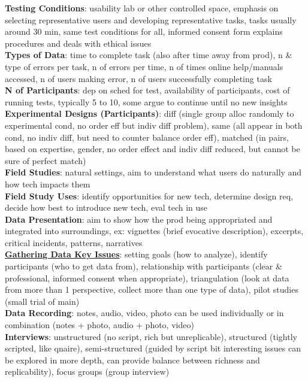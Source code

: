 \documentclass[a4paper]{article}
\begin{document}
\begin{multicols}{3}
        \textbf{Testing Conditions}: usability lab or other controlled space, emphasis on selecting representative users and developing representative tasks, tasks usually around 30 min, same test conditions for all, informed consent form explains procedures and deals with ethical issues\\
        \textbf{Types of Data}: time to complete task (also after time away from prod), n \& type of errors per task, n of errors per time, n of times online help/manuals accessed, n of users making error, n of users successfully completing task\\
        \textbf{N of Participants}: dep on sched for test, availability of participants, cost of running tests, typically 5 to 10, some argue to continue until no new insights\\
        \textbf{Experimental Designs (Participants)}: diff (single group alloc randomly to experimental cond, no order eff but indiv diff problem), same (all appear in both cond, no indiv diff, but need to counter balance order eff), matched (in pairs, based on expertise, gender, no order effect and indiv diff reduced, but cannot be sure of perfect match)\\
        \textbf{Field Studies}: natural settings, aim to understand what users do naturally and how tech impacts them\\
        \textbf{Field Study Uses}: identify opportunities for new tech, determine design req, decide how best to introduce new tech, eval tech in use\\
        \textbf{Data Presentation}: aim to show how the prod being appropriated and integrated into surroundings, ex: vignettes (brief evocative description), excerpts, critical incidents, patterns, narratives\\
        \underline{\textbf{Gathering Data Key Issues}}: setting goals (how to analyze), identify participants (who to get data from), relationship with participants (clear \& professional, informed consent when appropriate), triangulation (look at data from more than 1 perspective, collect more than one type of data), pilot studies (small trial of main)\\
        \textbf{Data Recording}: notes, audio, video, photo can be used individually or in combination (notes + photo, audio + photo, video)\\
        \textbf{Interviews}: unstructured (no script, rich but unreplicable), structured (tightly scripted, like qnaire), semi-structured (guided by script bit interesting issues can be explored in more depth, can provide balance between richness and replicability), focus groups (group interview)\\

\end{multicols}
\end{document}
